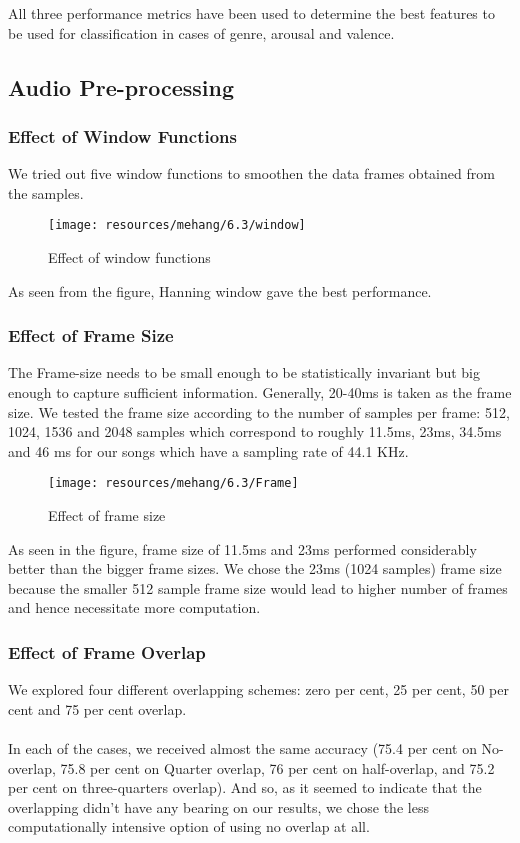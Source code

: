        All three performance metrics have been used to determine the best features to be used for classification in cases of genre, arousal and valence.

\subsection{Audio Pre-processing}
\subsubsection{Effect of Window Functions}
We tried out five window functions to smoothen the data frames obtained from the samples. 

\begin{figure}[h!]
        \centering
        \texttt{[image: resources/mehang/6.3/window]}
        \caption{Effect of window functions}
\end{figure}

As seen from the figure, Hanning window gave the best performance. 

\subsubsection{Effect of Frame Size}
The Frame-size needs to be small enough to be statistically invariant but big enough to capture sufficient information. Generally, 20-40ms is taken as the frame size. We tested the frame size according to the number of samples per frame: 512, 1024, 1536 and 2048 samples which correspond to roughly 11.5ms, 23ms, 34.5ms and 46 ms for our songs which have a sampling rate of 44.1 KHz.

\begin{figure}[h!]
        \centering
        \texttt{[image: resources/mehang/6.3/Frame]}
        \caption{Effect of frame size}
\end{figure}

As seen in the figure, frame size of 11.5ms and 23ms performed considerably better than the bigger frame sizes. We chose the 23ms (1024 samples) frame size because the smaller 512 sample frame size would lead to higher number of frames and hence necessitate more computation.

\subsubsection{Effect of Frame Overlap}
We explored four different overlapping schemes: zero per cent, 25 per cent, 50 per cent and 75 per cent overlap.\\
\\
In each of the cases, we received almost the same accuracy (75.4 per cent on No-overlap, 75.8 per cent on Quarter overlap, 76 per cent on half-overlap, and 75.2 per cent on three-quarters overlap). And so, as it seemed to indicate that the overlapping didn’t have any bearing on our results, we chose the less computationally intensive option of using no overlap at all. 

